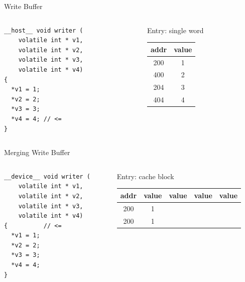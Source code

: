 \documentclass[aspectratio=169,compress]{beamer}
\begin{document}
\begin{frame}[fragile]{Write Buffer}{}
\centering
\begin{columns}[T]
	\begin{column}{0.4\textwidth}
\begin{lstlisting}[]
__host__ void writer (
    volatile int * v1,
    volatile int * v2,
    volatile int * v3,
    volatile int * v4)
{          
  *v1 = 1;
  *v2 = 2;
  *v3 = 3;
  *v4 = 4; // <=
}
\end{lstlisting}
\end{column}
\begin{column}{0.4\textwidth}
	\centering
	Entry: single word
	\begin{table}
		\begin{tabular}{| c | c |}
			\hline 
			addr & value \\
			\hline 
			200 & 1 \\
			\hline 
			400 & 2 \\
			\hline 
			204 & 3 \\
			\hline 
			404 & 4 \\
			\hline 
		\end{tabular}
	\end{table}
\end{column}
\end{columns}
\end{frame}


\begin{frame}[fragile]{Merging Write Buffer}{}
\centering
\begin{columns}[T]
	\begin{column}{0.4\textwidth}
\begin{lstlisting}[]
__device__ void writer (
    volatile int * v1,
    volatile int * v2,
    volatile int * v3,
    volatile int * v4)
{          // <= 
  *v1 = 1;
  *v2 = 2;
  *v3 = 3;
  *v4 = 4;
}
\end{lstlisting}
\end{column}
\begin{column}{0.5\textwidth}
	\centering
	Entry: cache block
	\begin{table}
		\begin{tabular}{| c | c | c | c | c |}
			\hline 
			addr & value & value & value & value  \\
			\hline 
			\textcolor{NordBlack}{200} & \textcolor{NordBlack}{1} & & & \\
			\hline 
			\textcolor{NordBlack}{200} & \textcolor{NordBlack}{1} & & & \\
			\hline 
		\end{tabular}
	\end{table}
\end{column}
\end{columns}
\end{frame}
\end{document}
